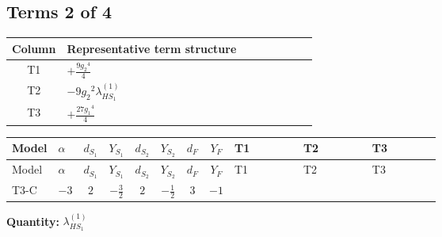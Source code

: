 \documentclass[8pt]{article}
\begin{document}
\begin{landscape}
\subsection*{Terms 2 of 4}
\begin{center}
\begin{tabular}{@{}c >{\raggedright\arraybackslash}p{0.82\linewidth}@{}}
\toprule
Column & Representative term structure \\
\midrule
T1 & \(\displaystyle +\frac{9 {g_2}^4}{4}\) \\
\midrule
T2 & \(\displaystyle -9 {g_2}^2 {\lambda_{HS_1}^{(1)}}\) \\
\midrule
T3 & \(\displaystyle +\frac{27 {g_1}^4}{4}\) \\
\midrule
\bottomrule
\end{tabular}
\end{center}
\smallskip
\tiny
\begin{longtable}{@{}llcccccc >{\raggedright\arraybackslash}p{0.21\linewidth} >{\raggedright\arraybackslash}p{0.21\linewidth} >{\raggedright\arraybackslash}p{0.21\linewidth}@{}}
\toprule
Model & $\alpha$ & $d_{S_1}$ & $Y_{S_1}$ & $d_{S_2}$ & $Y_{S_2}$ & $d_F$ & $Y_F$ & T1 & T2 & T3 \\
\midrule
\endfirsthead
\toprule
Model & $\alpha$ & $d_{S_1}$ & $Y_{S_1}$ & $d_{S_2}$ & $Y_{S_2}$ & $d_F$ & $Y_F$ & T1 & T2 & T3 \\
\midrule
\endhead
T3-C & $-3$ & $2$ & $-\frac{3}{2}$ & $2$ & $-\frac{1}{2}$ & $3$ & $-1$ & \scriptsize\adjustbox{max width=\linewidth}{$\begin{gathered} +\frac{9 {g_2}^4}{4}\end{gathered}$} & \scriptsize\adjustbox{max width=\linewidth}{$\begin{gathered} -9 {g_2}^2 {\lambda_{HS_1}^{(1)}}\end{gathered}$} & \scriptsize\adjustbox{max width=\linewidth}{$\begin{gathered} +\frac{27 {g_1}^4}{4}\end{gathered}$} \\
\midrule
\bottomrule
\end{longtable}
\clearpage
\noindent\textbf{Quantity: }$\lambda_{HS_1}^{(1)}$\par\smallskip

\end{landscape}
\end{document}
